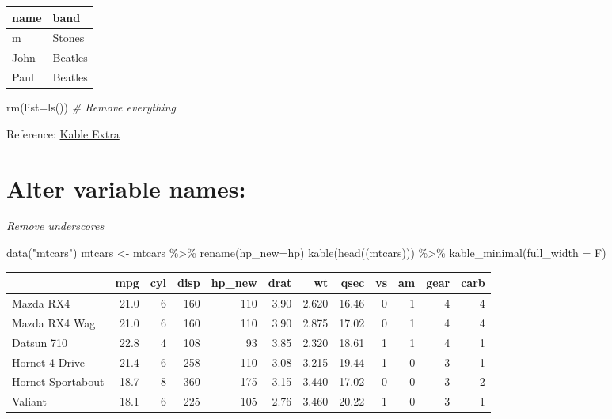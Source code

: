 \documentclass[
]{book}
\newenvironment{Shaded}{\begin{snugshade}}{\end{snugshade}}
\newcommand{\AttributeTok}[1]{\textcolor[rgb]{0.77,0.63,0.00}{#1}}
\newcommand{\CommentTok}[1]{\textcolor[rgb]{0.56,0.35,0.01}{\textit{#1}}}
\newcommand{\FunctionTok}[1]{\textcolor[rgb]{0.00,0.00,0.00}{#1}}
\newcommand{\NormalTok}[1]{#1}
\newcommand{\OtherTok}[1]{\textcolor[rgb]{0.56,0.35,0.01}{#1}}
\newcommand{\SpecialCharTok}[1]{\textcolor[rgb]{0.00,0.00,0.00}{#1}}
\newcommand{\StringTok}[1]{\textcolor[rgb]{0.31,0.60,0.02}{#1}}
\begin{document}
\begin{table}
\centering
\begin{tabular}{l|l}
\hline
name & band\\
\hline
m & Stones\\
\hline
John & Beatles\\
\hline
Paul & Beatles\\
\hline
\end{tabular}
\end{table}

\begin{Shaded}
\begin{Highlighting}[]
\FunctionTok{rm}\NormalTok{(}\AttributeTok{list=}\FunctionTok{ls}\NormalTok{()) }\CommentTok{\# Remove everything}
\end{Highlighting}
\end{Shaded}

Reference: \href{https://cran.r-project.org/web/packages/kableExtra/vignettes/awesome_table_in_html.html}{Kable Extra}

\hypertarget{alter-variable-names}{%
\section{Alter variable names:}\label{alter-variable-names}}

\emph{Remove underscores}

\begin{Shaded}
\begin{Highlighting}[]
\FunctionTok{data}\NormalTok{(}\StringTok{"mtcars"}\NormalTok{)}
\NormalTok{mtcars }\OtherTok{\textless{}{-}}\NormalTok{ mtcars }\SpecialCharTok{\%\textgreater{}\%} \FunctionTok{rename}\NormalTok{(}\AttributeTok{hp\_new=}\NormalTok{hp)}
\FunctionTok{kable}\NormalTok{(}\FunctionTok{head}\NormalTok{((mtcars))) }\SpecialCharTok{\%\textgreater{}\%} \FunctionTok{kable\_minimal}\NormalTok{(}\AttributeTok{full\_width =}\NormalTok{ F)}
\end{Highlighting}
\end{Shaded}

\begin{table}
\centering
\begin{tabular}{l|r|r|r|r|r|r|r|r|r|r|r}
\hline
  & mpg & cyl & disp & hp\_new & drat & wt & qsec & vs & am & gear & carb\\
\hline
Mazda RX4 & 21.0 & 6 & 160 & 110 & 3.90 & 2.620 & 16.46 & 0 & 1 & 4 & 4\\
\hline
Mazda RX4 Wag & 21.0 & 6 & 160 & 110 & 3.90 & 2.875 & 17.02 & 0 & 1 & 4 & 4\\
\hline
Datsun 710 & 22.8 & 4 & 108 & 93 & 3.85 & 2.320 & 18.61 & 1 & 1 & 4 & 1\\
\hline
Hornet 4 Drive & 21.4 & 6 & 258 & 110 & 3.08 & 3.215 & 19.44 & 1 & 0 & 3 & 1\\
\hline
Hornet Sportabout & 18.7 & 8 & 360 & 175 & 3.15 & 3.440 & 17.02 & 0 & 0 & 3 & 2\\
\hline
Valiant & 18.1 & 6 & 225 & 105 & 2.76 & 3.460 & 20.22 & 1 & 0 & 3 & 1\\
\hline
\end{tabular}
\end{table}
\end{document}
